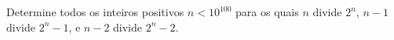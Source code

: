 Determine todos os inteiros positivos $n < 10^{100}$ para os quais $n$ divide $2^n$, $n-1$ divide $2^n - 1$, e $n-2$ divide $2^n - 2$.
